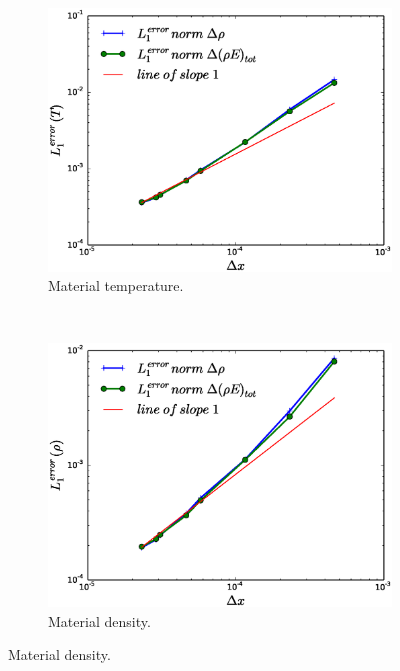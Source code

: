 \documentclass[times,doublespace]{fldauth}%
\begin{document}
\begin{figure}[ht]
    \begin{subfigure}{0.5\textwidth}
    \centering
    \includegraphics[width=\linewidth]{figures/dpt-xs/mass-energy-diff-scd-method-mat-temp-convergence.eps}
    \caption{Material temperature.}\label{fig:mach-3-dpt-xs-temp-conv}
    \end{subfigure}
    ~
    \begin{subfigure}{0.5\textwidth}
    \centering
    \includegraphics[width=\linewidth]{figures/dpt-xs/mass-energy-diff-scd-method-density-convergence.eps}
    \caption{Material density.}\label{fig:mach-3-dpt-xs-density-conv}
    \end{subfigure}
    

\end{figure}
\end{document}
